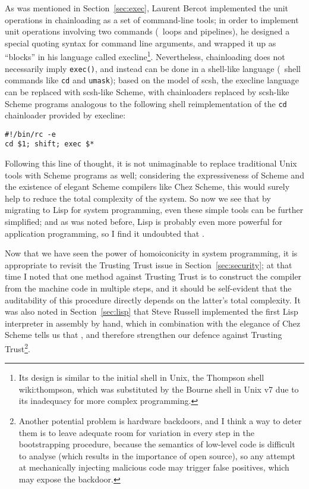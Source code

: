 As was mentioned in Section~\ref{sec:exec}, Laurent Bercot implemented the unit
operations in chainloading as a set of command-line tools; in order to implement
unit operations involving two commands (\eg~loops and pipelines), he designed
a special quoting syntax for command line arguments, and wrapped it up as
``blocks'' in his language called execline\footnote{Its
design is similar to the initial shell in Unix, the Thompson shell\cupercite%
{wiki:thompson}, which was substituted by the Bourne shell in Unix v7 due to
its inadequacy for more complex programming.}.  Nevertheless, chainloading
does not necessarily imply \verb|exec()|, and instead can be done in a
shell-like language (\cf~shell commands like \verb|cd|
and \verb|umask|); based on the model of scsh, the execline
language can be replaced with scsh-like Scheme, with chainloaders replaced by
scsh-like Scheme programs analogous to the following shell reimplementation of
the \verb|cd| chainloader provided by execline:
\begin{quoting}
\begin{Verbatim}
#!/bin/rc -e
cd $1; shift; exec $*
\end{Verbatim}
\end{quoting}

Following this line of thought, it is not unimaginable to replace traditional
Unix tools with Scheme programs as well; considering the expressiveness of
Scheme and the existence of elegant Scheme compilers like Chez Scheme, this
would surely help to reduce the total complexity of the system.  So now we
see that by migrating to Lisp for system programming, even these simple
tools can be further simplified; and as was noted before, Lisp is probably
even more powerful for application programming, so I find it undoubted
that .

Now that we have seen the power of homoiconicity in system programming, it is
appropriate to revisit the Trusting Trust issue in Section~\ref{sec:security};
at that time I noted that one method against Trusting Trust is to construct the
compiler from the machine code in multiple steps, and it should be self-evident
that the auditability of this procedure directly depends on the latter's total
complexity.  It was also noted in Section~\ref{sec:lisp} that Steve Russell
implemented the first Lisp interpreter in assembly by hand, which in combination
with the elegance of Chez Scheme tells us that ,
and therefore strengthen our defence against Trusting Trust\footnote{Another
potential problem is hardware backdoors, and I think a way to deter them is to
leave adequate room for variation in every step in the bootstrapping procedure,
because the semantics of low-level code is difficult to analyse (which results
in the importance of open source), so any attempt at mechanically injecting
malicious code may trigger false positives, which may expose the backdoor.}.

